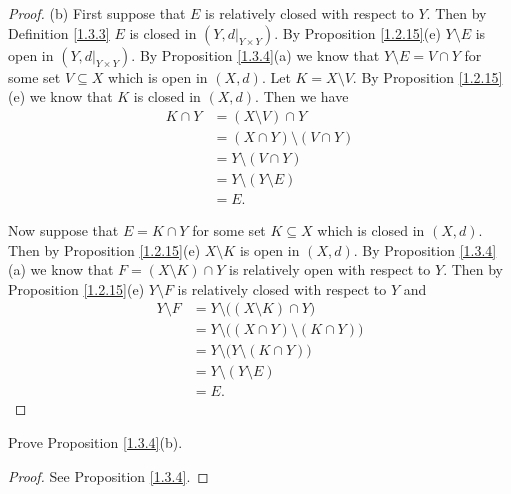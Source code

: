 \begin{proof}{(b)}
    First suppose that \(E\) is relatively closed with respect to \(Y\).
    Then by Definition \ref{1.3.3} \(E\) is closed in \((Y, d|_{Y \times Y})\).
    By Proposition \ref{1.2.15}(e) \(Y \setminus E\) is open in \((Y, d|_{Y \times Y})\).
    By Proposition \ref{1.3.4}(a) we know that \(Y \setminus E = V \cap Y\) for some set \(V \subseteq X\) which is open in \((X, d)\).
    Let \(K = X \setminus V\).
    By Proposition \ref{1.2.15}(e) we know that \(K\) is closed in \((X, d)\).
    Then we have
    \begin{align*}
        K \cap Y & = (X \setminus V) \cap Y          \\
                 & = (X \cap Y) \setminus (V \cap Y) \\
                 & = Y \setminus (V \cap Y)          \\
                 & = Y \setminus (Y \setminus E)     \\
                 & = E.
    \end{align*}

    Now suppose that \(E = K \cap Y\) for some set \(K \subseteq X\) which is closed in \((X, d)\).
    Then by Proposition \ref{1.2.15}(e) \(X \setminus K\) is open in \((X, d)\).
    By Proposition \ref{1.3.4}(a) we know that \(F = (X \setminus K) \cap Y\) is relatively open with respect to \(Y\).
    Then by Proposition \ref{1.2.15}(e) \(Y \setminus F\) is relatively closed with respect to \(Y\) and
    \begin{align*}
        Y \setminus F & = Y \setminus \big((X \setminus K) \cap Y\big)          \\
                      & = Y \setminus \big((X \cap Y) \setminus (K \cap Y)\big) \\
                      & = Y \setminus \big(Y \setminus (K \cap Y)\big)          \\
                      & = Y \setminus (Y \setminus E)                           \\
                      & = E.
    \end{align*}
\end{proof}

\exercisesection

\begin{exercise}\label{ex 1.3.1}
    Prove Proposition \ref{1.3.4}(b).
\end{exercise}

\begin{proof}
    See Proposition \ref{1.3.4}.
\end{proof}
